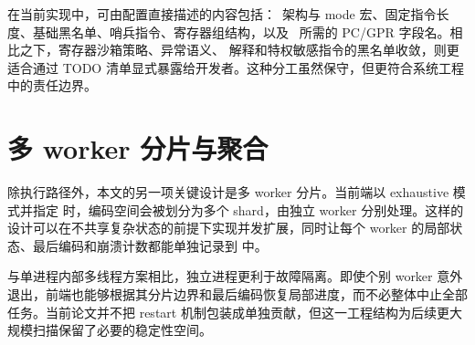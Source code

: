 在当前实现中，可由配置直接描述的内容包括：\capstone\ 架构与 mode 宏、固定指令长度、基础黑名单、哨兵指令、寄存器组结构，以及 \ptracebackend\ 所需的 PC/GPR 字段名。相比之下，寄存器沙箱策略、异常语义、 解释和特权敏感指令的黑名单收敛，则更适合通过 TODO 清单显式暴露给开发者。这种分工虽然保守，但更符合系统工程中的责任边界。

\section{多 worker 分片与聚合}

除执行路径外，本文的另一项关键设计是多 worker 分片。当前端以 exhaustive 模式并指定  时，编码空间会被划分为多个 shard，由独立 worker 分别处理。这样的设计可以在不共享复杂状态的前提下实现并发扩展，同时让每个 worker 的局部状态、最后编码和崩溃计数都能单独记录到  中。

与单进程内部多线程方案相比，独立进程更利于故障隔离。即使个别 worker 意外退出，前端也能够根据其分片边界和最后编码恢复局部进度，而不必整体中止全部任务。当前论文并不把 restart 机制包装成单独贡献，但这一工程结构为后续更大规模扫描保留了必要的稳定性空间。

